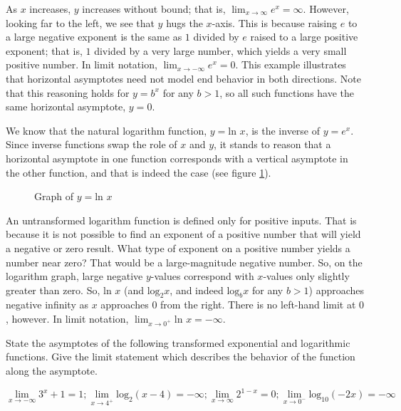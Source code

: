 As $x$ increases, $y$ increases without bound; that is, $\lim_{x \rightarrow 
\infty} e^x = \infty$. However, looking far to the left, we see that $y$ hugs the 
$x$-axis. This is because raising $e$ to a large negative exponent is the same as 
$1$ divided by $e$ raised to a large positive exponent; that is, $1$ divided by a 
very large number, which yields a very small positive number. In limit notation, 
$\lim_{x \rightarrow -\infty} e^x = 0$. This example illustrates that horizontal 
asymptotes need not model end behavior in both directions. Note that this reasoning 
holds for $y = b^x$ for any $b > 1$, so all such functions have the same horizontal 
asymptote, $y = 0$.

We know that the natural logarithm function, $y = \text{ln } x$, is the inverse of 
$y = e^x$. Since inverse functions swap the role of $x$ and $y$, it stands to 
reason that a horizontal asymptote in one function corresponds with a vertical 
asymptote in the other function, and that is indeed the case (see figure 
\ref{fig:log}).

\begin{figure}[htbp]
  \centering
  \caption{Graph of \( y = \text{ln } x \)}
  \label{fig:log}
\end{figure}	

An untransformed logarithm function is defined only for positive inputs. That is 
because it is not possible to find an exponent of a positive number that will 
yield a negative or zero result. What type of exponent on a positive number yields 
a number near zero? That would be a large-magnitude negative number. So, on the 
logarithm graph, large negative $y$-values correspond with $x$-values only slightly 
greater than zero. So, $\text{ln } x$ (and $\text{log}_2 x$, and indeed 
$\text{log}_b x$ for any $b > 1$) approaches negative infinity as $x$ approaches 
$0$ from the right. There is no left-hand limit at $0$, however. In limit notation, 
$\lim_{x \rightarrow 0^+} \text{ln } x = -\infty$.

\begin{Exercise}[title=Limits Practice 2, label=limits2]
  State the asymptotes of the following transformed exponential and logarithmic 
  functions. Give the limit statement which describes the behavior of the function 
  along the asymptote.
  \vspace{40mm}
\end{Exercise}
\begin{Answer}[ref=limits2] 
	$$ \lim_{x \rightarrow -\infty} 3^x + 1 = 1; \lim_{x \rightarrow 4^+} 
	\text{log}_2 (x-4) = -\infty; \lim_{x \rightarrow \infty} 2^{1-x} = 0; \lim_{x 
	\rightarrow 0^-} \text{log}_{10} (-2x) = -\infty $$
\end{Answer}

